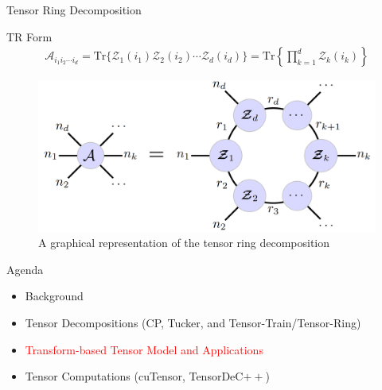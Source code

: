 \documentclass[t, 10pt, handout, aspectratio=169]{beamer}
\begin{document}
\begin{frame}{Tensor Ring Decomposition}
\large
\begin{block}{TR Form}
$$
\begin{aligned}
\mathcal{A}_{i_1i_2\cdots i_d}=\text{Tr}\{\mathcal{Z}_1(i_1)\mathcal{Z}_2(i_2)\cdots\mathcal{Z}_d(i_d)\}
=\text{Tr}\left\{\prod_{k=1}^{d}\mathcal{Z}_k(i_k)\right\}
\end{aligned}
$$
\end{block}
\normalsize
\begin{figure}
	\centering  
	\includegraphics[width=0.45\linewidth]{figs/tensor_ring_arch.png} \\
	A graphical representation of the tensor ring decomposition
	\label{fig:tensor_ring_arch}
\end{figure}
\end{frame}

\begin{frame}{Agenda}
\begin{itemize}
    \large \item {Background}
    \large \item {Tensor Decompositions (CP, Tucker, and Tensor-Train/Tensor-Ring)}
    \large \item \textcolor{red}{Transform-based Tensor Model and Applications}
    \large \item{Tensor Computations (cuTensor, TensorDeC$++$)}
\end{itemize}
\end{frame}

\end{document}
